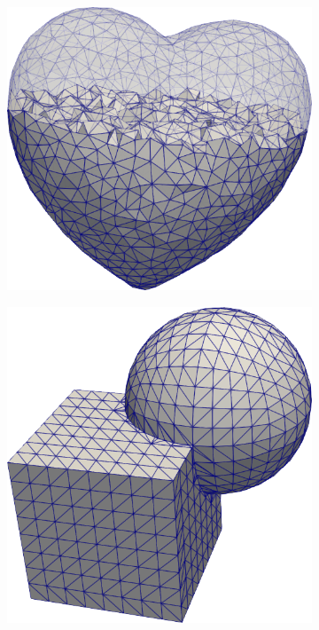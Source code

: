 \documentclass{ansarticle-preprint}
\begin{document}
  \begin{figure}
    \centering
    \begin{subfigure}[b]{0.28\textwidth}
      \centering
      \includegraphics[width=\textwidth]{png/heart_implicit.png}
      \caption{\label{fig:heart_tria}}
    \end{subfigure}\qquad
    \hfill
    \begin{subfigure}[b]{0.28\textwidth}
      \centering
      \includegraphics[width=\textwidth]{png/intersection_cube_sphere_mesh.png}

\end{subfigure}
\end{figure}
\end{document}
